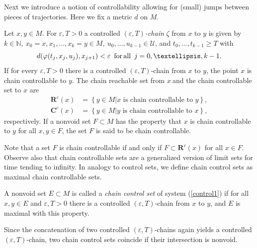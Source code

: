 \documentclass{siamltex}%
\begin{document}
Next we introduce a notion of controllability allowing for (small) jumps
between pieces of trajectories. Here we fix a metric $d$ on $M$.

\begin{definition}
\label{intro2:defchains}Let $x,y\in M$. For $\varepsilon,T>0$ a controlled
$(\varepsilon,T)$\textit{-chain} $\zeta$ from $x$ to $y$ is given by
$k\in\mathbb{N},\ x_{0}=x,x_{1},\ldots,x_{k}=y\in M,\ u_{0},\ldots,u_{k-1}%
\in\mathcal{U}$, and $t_{0},\ldots,t_{k-1}\geq T$ with
\[
d(\varphi(t_{j},x_{j},u_{j}),x_{j+1})<\varepsilon\text{ }\,\text{for\thinspace
all}\,\,\,j=0,\ldots,k-1.
\]
If for every $\varepsilon,T>0$ there is a controlled $(\varepsilon,T)$-chain
from $x$ to $y$, the point $x$ is chain controllable to $y$. The chain
reachable set from $x\ $and the chain controllable set to $x$ are
\begin{align*}
\mathbf{R}^{c}(x)  &  =\left\{  y\in M\left\vert x\text{ is chain controllable
to }y\right.  \right\}  ,\\
\mathbf{C}^{c}(x)  &  =\left\{  y\in M\left\vert y\text{ is chain controllable
to }x\right.  \right\}  ,
\end{align*}
respectively. If a nonvoid set $F\subset M$ has the property that $x$ is chain
controllable to $y$ for all $x,y\in F$, the set $F$ is said to be chain controllable.
\end{definition}

Note that a set $F$ is chain controllable if and only if $F\subset
\mathbf{R}^{c}(x)$ for all $x\in F$. Observe also that chain controllable sets
are a generalized version of limit sets for time tending to infinity. In
analogy to control sets, we define chain control sets as maximal chain
controllable sets.

\begin{definition}
\label{Definition_chain_control}A nonvoid set $E\subset M$ is called a
\textit{chain control set} of system (\ref{control1}) if for all $x,y\in E$
and $\varepsilon,T>0$ there is a controlled $(\varepsilon,T)$-chain from $x$
to $y$, and $E$ is maximal with this property.
\end{definition}

Since the concatenation of two controlled $(\varepsilon,T)$-chains again
yields a controlled $(\varepsilon,T)$-chain, two chain control sets coincide
if their intersection is nonvoid.
\end{document}
